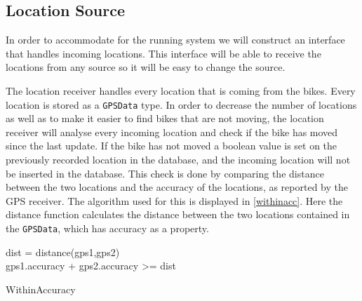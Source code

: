 \subsection{Location Source}\label{design:location_source}
In order to accommodate for the running system we will construct an interface that handles incoming locations.
This interface will be able to receive the locations from any source so it will be easy to change the source.

The location receiver handles every location that is coming from the bikes.
Every location is stored as a \texttt{GPSData} type.
In order to decrease the number of locations as well as to make it easier to find bikes that are not moving, the location receiver will analyse every incoming location and check if the bike has moved since the last update.
If the bike has not moved a boolean value is set on the previously recorded location in the database, and the incoming location will not be inserted in the database.
This check is done by comparing the distance between the two locations and the accuracy of the locations, as reported by the GPS receiver.
The algorithm used for this is displayed in \cref{withinacc}.
Here the distance function calculates the distance between the two locations contained in the \texttt{GPSData}, which has accuracy as a property.

\begin{algorithm}

dist = distance(gps1,gps2)\\
\Return gps1.accuracy + gps2.accuracy >= dist

\caption{WithinAccuracy}
\label{withinacc}
\end{algorithm}